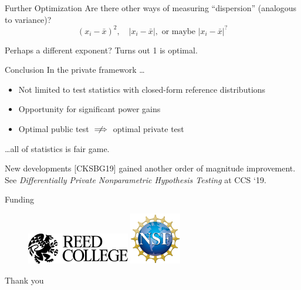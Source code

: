 \documentclass{beamer}
\begin{document}
\begin{frame}{Further Optimization}
\pause
Are there other ways of measuring ``dispersion'' (analogous to variance)? 
$$(x_i - \bar{x})^2, \quad \lvert x_i - \bar{x} \rvert, \text{ or maybe }\lvert x_i - \bar{x} \rvert^?$$  \pause

Perhaps a different exponent? \pause Turns out 1 is optimal.
\end{frame}

\begin{frame}{Conclusion}
\pause
\large In the private framework \ldots \par \pause
 \normalsize
\begin{itemize}
	\item Not limited to test statistics with closed-form reference distributions \pause
	\item Opportunity for significant power gains \pause
	\item Optimal public test $\centernot \implies$ optimal private test \pause
\end{itemize}

\large \ldots all of statistics is fair game. \pause
 \normalsize
 
 \begin{block}{New developments}
[CKSBG19] gained another order of magnitude improvement. See \textit{Differentially Private Nonparametric Hypothesis Testing} at CCS `19.
 \end{block} \pause
Funding
\begin{figure}
\includegraphics[width=0.4\textwidth]{images/reed-logo}%
\includegraphics[width=0.2\textwidth]{images/NSF-logo}
\end{figure}

\end{frame}



\begin{frame}{}
    \begin{center}
        \Huge Thank you
    \end{center}    
\end{frame}
\end{document}
